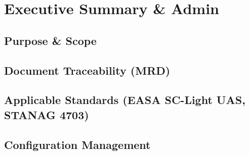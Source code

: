 ﻿\chapter{Executive Summary \& Admin}
\label{ch:admin}
\section{Purpose \& Scope}
\section{Document Traceability (MRD)}
\section{Applicable Standards (EASA SC-Light UAS, STANAG 4703)}
\section{Configuration Management}
